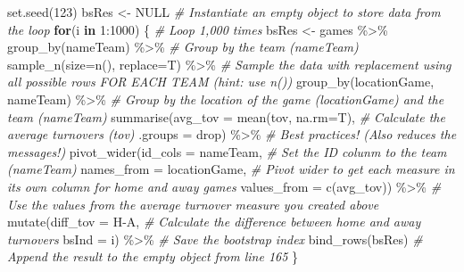 \documentclass[
]{article}
\newenvironment{Shaded}{\begin{snugshade}}{\end{snugshade}}
\newcommand{\AttributeTok}[1]{\textcolor[rgb]{0.77,0.63,0.00}{#1}}
\newcommand{\CommentTok}[1]{\textcolor[rgb]{0.56,0.35,0.01}{\textit{#1}}}
\newcommand{\ConstantTok}[1]{\textcolor[rgb]{0.00,0.00,0.00}{#1}}
\newcommand{\ControlFlowTok}[1]{\textcolor[rgb]{0.13,0.29,0.53}{\textbf{#1}}}
\newcommand{\DecValTok}[1]{\textcolor[rgb]{0.00,0.00,0.81}{#1}}
\newcommand{\FunctionTok}[1]{\textcolor[rgb]{0.00,0.00,0.00}{#1}}
\newcommand{\NormalTok}[1]{#1}
\newcommand{\OtherTok}[1]{\textcolor[rgb]{0.56,0.35,0.01}{#1}}
\newcommand{\SpecialCharTok}[1]{\textcolor[rgb]{0.00,0.00,0.00}{#1}}
\newcommand{\StringTok}[1]{\textcolor[rgb]{0.31,0.60,0.02}{#1}}
\begin{document}
\begin{Shaded}
\begin{Highlighting}[]
\FunctionTok{set.seed}\NormalTok{(}\DecValTok{123}\NormalTok{)}
\NormalTok{bsRes }\OtherTok{\textless{}{-}} \ConstantTok{NULL} \CommentTok{\# Instantiate an empty object to store data from the loop}
\ControlFlowTok{for}\NormalTok{(i }\ControlFlowTok{in} \DecValTok{1}\SpecialCharTok{:}\DecValTok{1000}\NormalTok{) \{ }\CommentTok{\# Loop 1,000 times}
\NormalTok{  bsRes }\OtherTok{\textless{}{-}}\NormalTok{ games }\SpecialCharTok{\%\textgreater{}\%}
    \FunctionTok{group\_by}\NormalTok{(nameTeam) }\SpecialCharTok{\%\textgreater{}\%} \CommentTok{\# Group by the team (nameTeam)}
    \FunctionTok{sample\_n}\NormalTok{(}\AttributeTok{size=}\FunctionTok{n}\NormalTok{(), }\AttributeTok{replace=}\NormalTok{T) }\SpecialCharTok{\%\textgreater{}\%} \CommentTok{\# Sample the data with replacement using all possible rows FOR EACH TEAM (hint: use n())}
    \FunctionTok{group\_by}\NormalTok{(locationGame, nameTeam) }\SpecialCharTok{\%\textgreater{}\%} \CommentTok{\# Group by the location of the game (locationGame) and the team (nameTeam)}
    \FunctionTok{summarise}\NormalTok{(}\AttributeTok{avg\_tov =} \FunctionTok{mean}\NormalTok{(tov, }\AttributeTok{na.rm=}\NormalTok{T), }\CommentTok{\# Calculate the average turnovers (tov)}
              \AttributeTok{.groups =} \StringTok{\textquotesingle{}drop\textquotesingle{}}\NormalTok{) }\SpecialCharTok{\%\textgreater{}\%} \CommentTok{\# Best practices! (Also reduces the messages!)}
    \FunctionTok{pivot\_wider}\NormalTok{(}\AttributeTok{id\_cols =}\NormalTok{ nameTeam, }\CommentTok{\# Set the ID colunm to the team (nameTeam)}
                \AttributeTok{names\_from =}\NormalTok{ locationGame, }\CommentTok{\# Pivot wider to get each measure in its own column for home and away games}
                \AttributeTok{values\_from =} \FunctionTok{c}\NormalTok{(}\StringTok{\textquotesingle{}avg\_tov\textquotesingle{}}\NormalTok{)) }\SpecialCharTok{\%\textgreater{}\%} \CommentTok{\# Use the values from the average turnover measure you created above}
    \FunctionTok{mutate}\NormalTok{(}\AttributeTok{diff\_tov =}\NormalTok{ H}\SpecialCharTok{{-}}\NormalTok{A, }\CommentTok{\# Calculate the difference between home and away turnovers}
           \AttributeTok{bsInd =}\NormalTok{ i) }\SpecialCharTok{\%\textgreater{}\%} \CommentTok{\# Save the bootstrap index}
    \FunctionTok{bind\_rows}\NormalTok{(bsRes) }\CommentTok{\# Append the result to the empty object from line 165}
\NormalTok{\} }


\end{Highlighting}
\end{Shaded}
\end{document}
